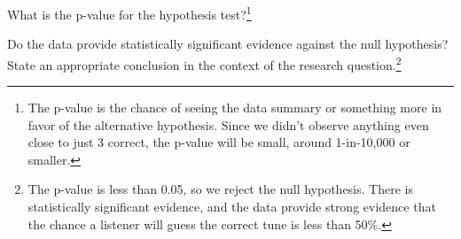 \begin{exercise}
What is the p-value for the hypothesis test?\footnote{The p-value is the chance of seeing the data summary or something more in favor of the alternative hypothesis. Since we didn't observe anything even close to just 3 correct, the p-value will be small, around 1-in-10,000 or smaller.}
\end{exercise}

\begin{exercise}
Do the data provide statistically significant evidence against the null hypothesis? State an appropriate conclusion in the context of the research question.\footnote{The p-value is less than 0.05, so we reject the null hypothesis. There is statistically significant evidence, and the data provide strong evidence that the chance a listener will guess the correct tune is less than 50\%.}
\end{exercise}


\textPE{\newpage}
